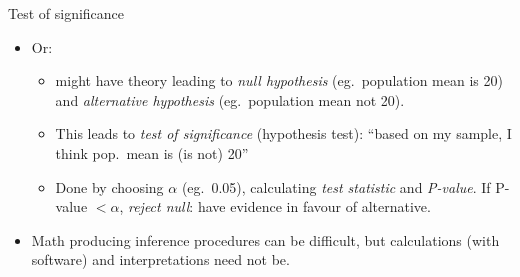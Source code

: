 \documentclass[pdf]{prosper}
\begin{document}
\begin{slide}{Test of significance}
\begin{itemize}
\item Or: 
  \begin{itemize}
  \item 
might have theory leading to {\em null hypothesis} (eg.\ population mean is 20) and {\em alternative hypothesis} (eg.\ population mean not 20).
\item This leads to {\em test of significance} (hypothesis test): ``based on my sample, I think pop.\ mean is (is not) 20''
\item Done by choosing $\alpha$ (eg.\ 0.05), calculating {\em test statistic} and {\em P-value}. If P-value $< \alpha$, {\em reject null}: have evidence in favour of alternative.
  \end{itemize}
\item Math producing inference procedures can be difficult, but calculations (with software) and interpretations need not be.
  \end{itemize}


\end{slide}
\end{document}
